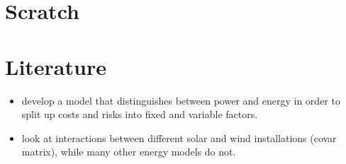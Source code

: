 \documentclass[11pt,a4paper]{extarticle}
\begin{document}
\pagebreak

\section{Scratch}

\pagebreak

\section{Literature}

\begin{itemize}
	\item \cite{Delarue} develop a model that distinguishes between power and energy in order to split up costs and risks into fixed and variable factors. 
	\item \cite{SB2018} look at interactions between different solar and wind installations (covar matrix), while many other energy models do not.
\end{itemize}
\end{document}

